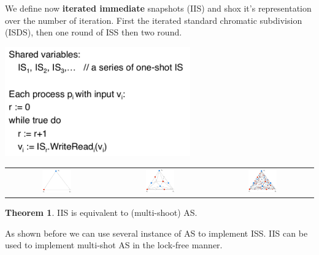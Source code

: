 \documentclass{article}
\theoremstyle{definition}
\newtheorem{theorem}{Theorem}
\begin{document}
We define now \textbf{iterated immediate} snapshots (IIS) and shox it's representation over the number of iteration. First the iterated standard chromatic subdivision (ISDS), then one round of ISS then two round.
\begin{center}
\includegraphics[width=0.6\textwidth]{iis}\\
\begin{tabular}{c c c}
\includegraphics[width=0.3\textwidth]{iss_0} &
\includegraphics[width=0.3\textwidth]{iss_1} &
\includegraphics[width=0.3\textwidth]{iss_2}
\end{tabular}
\end{center}

\begin{theorem}
IIS is equivalent to (multi-shoot) AS.
\end{theorem}

As shown before  we can use several instance of AS to implement ISS. IIS can be used to implement multi-shot AS in the lock-free manner.
\end{document}

